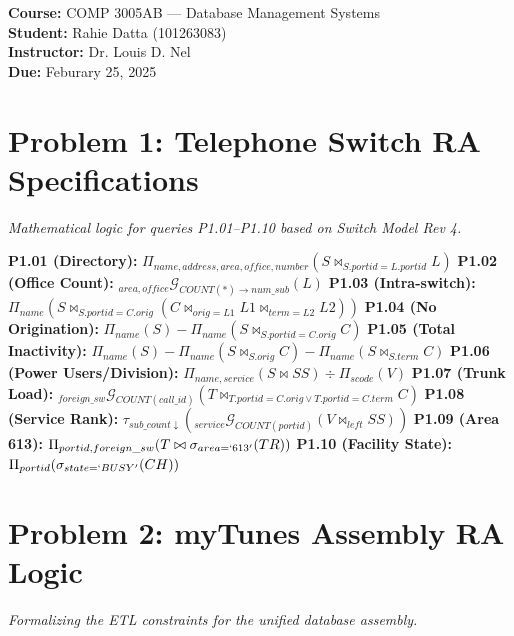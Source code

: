 \documentclass[12pt, answers]{exam}
\begin{document}
\begin{center}
    \begin{tcolorbox}[colback=darkblue!5, colframe=darkblue!75!black, title=\centering\Huge{Relational Algebra: Assignment 3 + Quiz 3}]
        \LARGE
        \textbf{Course:} COMP 3005AB --- Database Management Systems \\
        \textbf{Student:} Rahie Datta (101263083) \\
        \textbf{Instructor:} Dr. Louis D. Nel \\
        \textbf{Due:} Feburary 25, 2025
    \end{tcolorbox}
\end{center}

\section{Problem 1: Telephone Switch RA Specifications}
\textit{Mathematical logic for queries P1.01--P1.10 based on Switch Model Rev 4.}

\begin{questions}
    \question \textbf{P1.01 (Directory):} $\Pi_{name, address, area, office, number} (S \bowtie_{S.portid = L.portid} L)$
    \question \textbf{P1.02 (Office Count):} $_{area, office} \mathcal{G}_{COUNT(*) \rightarrow num\_sub} (L)$
    \question \textbf{P1.03 (Intra-switch):} $\Pi_{name} (S \bowtie_{S.portid = C.orig} (C \bowtie_{orig=L1} L1 \bowtie_{term=L2} L2))$
    \question \textbf{P1.04 (No Origination):} $\Pi_{name}(S) - \Pi_{name}(S \bowtie_{S.portid = C.orig} C)$
    \question \textbf{P1.05 (Total Inactivity):} $\Pi_{name}(S) - \Pi_{name}(S \bowtie_{S.orig} C) - \Pi_{name}(S \bowtie_{S.term} C)$
    \question \textbf{P1.06 (Power Users/Division):} $\Pi_{name, service}(S \bowtie SS) \div \Pi_{scode}(V)$
    \question \textbf{P1.07 (Trunk Load):} $_{foreign\_sw} \mathcal{G}_{COUNT(call\_id)} (T \bowtie_{T.portid=C.orig \lor T.portid=C.term} C)$
    \question \textbf{P1.08 (Service Rank):} $\tau_{sub\_count \downarrow} (_{service} \mathcal{G}_{COUNT(portid)} (V \bowtie_{left} SS))$
    \question \textbf{P1.09 (Area 613):} $\Pi_{portid, foreign\_sw} (T \bowtie \sigma_{area=`613'}(TR))$
    \question \textbf{P1.10 (Facility State):} $\Pi_{portid} (\sigma_{state=`BUSY'}(CH))$
\end{questions}



\section{Problem 2: myTunes Assembly RA Logic}
\textit{Formalizing the ETL constraints for the unified database assembly.}
\end{document}
